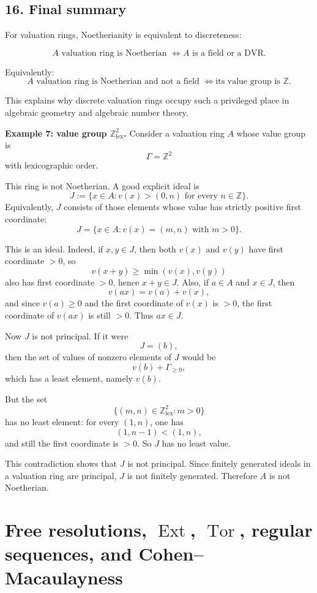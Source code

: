 \documentclass[12pt,a4paper]{article}
\theoremstyle{notespace}
\DeclareMathOperator{\Tor}{Tor}
\DeclareMathOperator{\Ext}{Ext}
\begin{document}
\subsection{16. Final summary}

For valuation rings, Noetherianity is equivalent to discreteness:

\[
\boxed{
	A \text{ valuation ring is Noetherian }
	\iff
	A \text{ is a field or a DVR.}
}
\]

Equivalently:
\[
\boxed{
	A \text{ valuation ring is Noetherian and not a field }
	\iff
	\text{its value group is } \mathbb Z.
}
\]

This explains why discrete valuation rings occupy such a privileged place in algebraic geometry and algebraic number theory.

\textbf{Example 7: value group \(\mathbb Z^2_{\mathrm{lex}}\).}
Consider a valuation ring \(A\) whose value group is
\[
\Gamma=\mathbb Z^2
\]
with lexicographic order.

This ring is not Noetherian. A good explicit ideal is
\[
J:=\{x\in A : v(x)>(0,n)\text{ for every }n\in \mathbb Z\}.
\]
Equivalently, \(J\) consists of those elements whose value has strictly positive first coordinate:
\[
J=\{x\in A : v(x)=(m,n)\text{ with }m>0\}.
\]

This is an ideal. Indeed, if \(x,y\in J\), then both \(v(x)\) and \(v(y)\) have first coordinate \(>0\), so
\[
v(x+y)\ge \min(v(x),v(y))
\]
also has first coordinate \(>0\), hence \(x+y\in J\). Also, if \(a\in A\) and \(x\in J\), then
\[
v(ax)=v(a)+v(x),
\]
and since \(v(a)\ge 0\) and the first coordinate of \(v(x)\) is \(>0\), the first coordinate of \(v(ax)\) is still \(>0\). Thus \(ax\in J\).

Now \(J\) is not principal. If it were
\[
J=(b),
\]
then the set of values of nonzero elements of \(J\) would be
\[
v(b)+\Gamma_{\ge 0},
\]
which has a least element, namely \(v(b)\).

But the set
\[
\{(m,n)\in \mathbb Z^2_{\mathrm{lex}} : m>0\}
\]
has no least element: for every \((1,n)\), one has
\[
(1,n-1)<(1,n),
\]
and still the first coordinate is \(>0\). So \(J\) has no least value.

This contradiction shows that \(J\) is not principal. Since finitely generated ideals in a valuation ring are principal, \(J\) is not finitely generated. Therefore \(A\) is not Noetherian.

\section{Free resolutions, \(\Ext\), \(\Tor\), regular sequences, and Cohen--Macaulayness}
\end{document}
